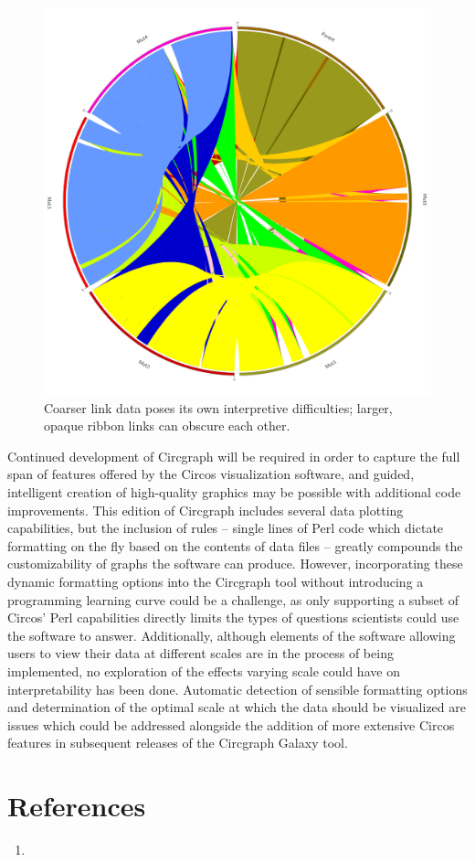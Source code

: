 \documentclass{article}
\begin{document}
\begin{figure}[H]
\centering
\includegraphics[scale=0.1]{./Generated_Color_Fixes.png}
\caption{Coarser link data poses its own interpretive difficulties; larger, opaque ribbon links can obscure each other.}
\end{figure}

Continued development of Circgraph will be required in order to capture the full span of features offered by the Circos visualization software, and guided, intelligent creation of high-quality graphics may be possible with additional code improvements. This edition of Circgraph includes several data plotting capabilities, but the inclusion of rules -- single lines of Perl code which dictate formatting on the fly based on the contents of data files -- greatly compounds the customizability of graphs the software can produce. However, incorporating these dynamic formatting options into the Circgraph tool without introducing a programming learning curve could be a challenge, as only supporting a subset of Circos' Perl capabilities directly limits the types of questions scientists could use the software to answer. Additionally, although elements of the software allowing users to view their data at different scales are in the process of being implemented, no exploration of the effects varying scale could have on interpretability has been done. Automatic detection of sensible formatting options and determination of the optimal scale at which the data should be visualized are issues which could be addressed alongside the addition of more extensive Circos features in subsequent releases of the Circgraph Galaxy tool.

\section*{References}
\begin{enumerate}
\item
\end{enumerate}
\end{document}
